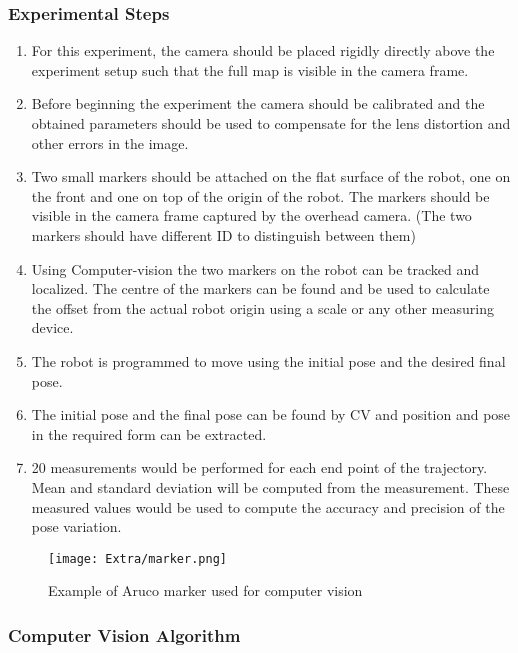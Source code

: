\documentclass[10pt,a4paper]{article}
\begin{document}
	\subsubsection{Experimental Steps}
	
\begin{enumerate}
	\item
	For this experiment, the camera should be placed rigidly directly above the experiment setup such that the full map is visible in the camera frame. 
	\item
	Before beginning the experiment the camera should be calibrated and the obtained parameters should be used to compensate for the lens distortion and other errors in the image. 
	\item
	Two small markers should be attached on the flat surface of the robot, one on the front and one on top of the origin of the robot. The markers should be visible in the camera frame captured by the overhead camera. (The two markers should have different ID to distinguish between them)
	\item
    Using Computer-vision the two markers on the robot can be tracked and localized. The centre of the markers can be found and be used to calculate the offset from the actual robot origin using a scale or any other measuring device.
	\item
	The robot is programmed to move using the initial pose and the desired final pose.
	\item
	The initial pose and the final pose can be found by CV and position and pose in the required form can be extracted.
	\item
	20 measurements would be performed for each end point of the trajectory. Mean and standard deviation will be computed from the measurement. These measured values would be used to compute the accuracy and precision of the pose variation. 
	
\end{enumerate}

\vspace{0.5cm}

\begin{figure}[h]
	\centering
	\texttt{[image: Extra/marker.png]}
	\caption{ Example of Aruco marker used for computer vision}
\end{figure}


\subsubsection{Computer Vision Algorithm}
\end{document}
